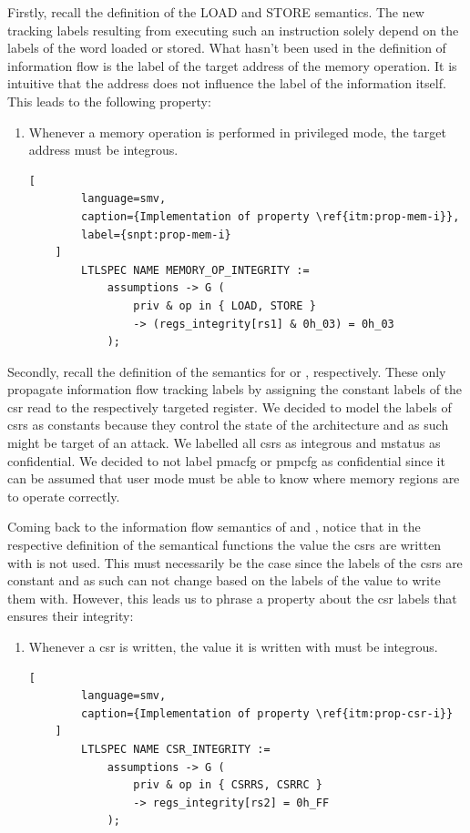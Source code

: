 Firstly, recall the definition of the LOAD and STORE semantics.
The new tracking labels resulting from executing such an instruction solely depend on the labels of the word loaded or stored.
What hasn't been used in the definition of information flow is the label of the target address of the memory operation.
It is intuitive that the address does not influence the label of the information itself.
This leads to the following property:
\begin{enumerate}[label=\Roman*.,series=]
    \item \label{itm:prop-mem-i}
    Whenever a memory operation is performed in privileged mode, the target address must be integrous.

    \begin{lstlisting}[
        language=smv,
        caption={Implementation of property \ref{itm:prop-mem-i}},
        label={snpt:prop-mem-i}
    ]
        LTLSPEC NAME MEMORY_OP_INTEGRITY :=
            assumptions -> G (
                priv & op in { LOAD, STORE }
                -> (regs_integrity[rs1] & 0h_03) = 0h_03
            );
    \end{lstlisting}
\end{enumerate}

Secondly, recall the definition of the semantics for  or , respectively.
These only propagate information flow tracking labels by assigning the constant labels of the \gls{csr} read to the respectively targeted register.
We decided to model the labels of \glspl{csr} as constants because they control the state of the architecture and as such might be target of an attack.
We labelled all \glspl{csr} as integrous and \gls{mstatus} as confidential.
We decided to not label \gls{pmacfg} or \gls{pmpcfg} as confidential since it can be assumed that user mode must be able to know where memory regions are to operate correctly.

Coming back to the information flow semantics of  and , notice that in the respective definition of the semantical functions the value the \glspl{csr} are written with is not used.
This must necessarily be the case since the labels of the \glspl{csr} are constant and as such can not change based on the labels of the value to write them with.
However, this leads us to phrase a property about the \gls{csr} labels that ensures their integrity:
\begin{enumerate}[label=\Roman*.,resume]
    \item \label{itm:prop-csr-i}
    Whenever a \gls{csr} is written, the value it is written with must be integrous.

    \begin{lstlisting}[
        language=smv,
        caption={Implementation of property \ref{itm:prop-csr-i}}
    ]
        LTLSPEC NAME CSR_INTEGRITY :=
            assumptions -> G (
                priv & op in { CSRRS, CSRRC }
                -> regs_integrity[rs2] = 0h_FF
            );
    \end{lstlisting}
\end{enumerate}

